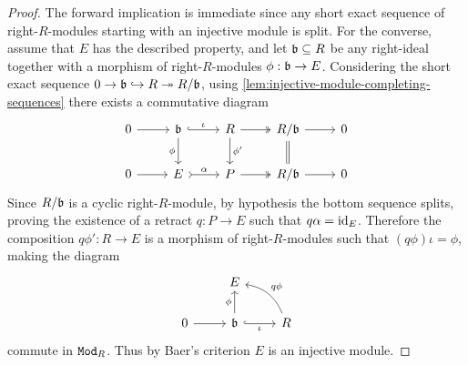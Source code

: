 \begin{proof}
The forward implication is immediate since any short exact sequence of
right-\(R\)-modules starting with an injective module is split. For the
converse, assume that \(E\) has the described property, and let
\(\mathfrak{b} \subseteq R\) be any right-ideal together with a morphism of
right-\(R\)-modules \(\phi: \mathfrak{b} \to E\). Considering the short exact
sequence \(0 \to \mathfrak{b} \hookrightarrow R \twoheadrightarrow R/{\mathfrak{b}}\), using
\cref{lem:injective-module-completing-sequences} there exists a commutative
diagram
\[
\begin{tikzcd}
0 \ar[r]
&\ideal b \ar[r, hook, "\iota"] \ar[d, "\phi"']
&R \ar[r, two heads] \ar[d, "\phi'"]
&R/{\ideal b} \ar[d, equals] \ar[r]
&0
\\
0 \ar[r]
&E \ar[r, tail, "\alpha"]
&P \ar[r, two heads]
&R/{\ideal b} \ar[r]
&0
\end{tikzcd}
\]
Since \(R/{\mathfrak{b}}\) is a cyclic right-\(R\)-module, by hypothesis the bottom
sequence splits, proving the existence of a retract \(q: P \to E\) such that
\(q \alpha = \operatorname{id}_E\). Therefore the composition \(q \phi': R \to E\) is a
morphism of right-\(R\)-modules such that \((q \phi) \iota = \phi\), making the
diagram
\[
\begin{tikzcd}
&E &
\\
0 \ar[r]
&\ideal b \ar[r, hook, "\iota"'] \ar[u, "\phi"]
&R \ar[lu, bend right, "q \phi"']
\end{tikzcd}
\]
commute in \({\texttt{Mod}_{R}}\). Thus by Baer's criterion \(E\) is an injective module.
\end{proof}

